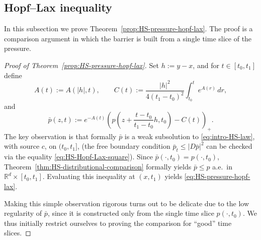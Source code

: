 \documentclass[11pt]{amsart}
\numberwithin{equation}{section}
\numberwithin{figure}{section}
\theoremstyle{plain}
\theoremstyle{definition}
\theoremstyle{remark}
\theoremstyle{plain}
\newcommand{\abs}[1]{\lvert #1 \rvert}
\def\R{\mathbb{R}}
\begin{document}
\subsection{Hopf--Lax inequality}
\label{subsec:HS-Hopf-Lax-finite-q}
In this subsection we prove Theorem~\ref{prop:HS-pressure-hopf-lax}. The proof
is a comparison argument in which the barrier is built from a single time slice of the
pressure.

\begin{proof}[Proof of Theorem~\ref{prop:HS-pressure-hopf-lax}]
Set \(h:=y-x\), and for \(t\in[t_0,t_1]\) define
\begin{equation}\label{eq:HS-Hopf-Lax-A-C}
    A(t):= A(|h|,t),
    \qquad
    C(t):=
    \frac{\abs{h}^2}{4(t_1-t_0)^2}\int_{t_0}^t e^{A(r)}\,dr,
\end{equation}
and
\begin{equation}\label{eq:HS-Hopf-Lax-subsolution}
    \bar p(z,t):=
    e^{-A(t)}
    \left(p\left(z+\frac{t-t_0}{t_1-t_0}h,t_0\right)-C(t)\right)_+ .
\end{equation}
 The key
observation is that formally \(\bar p\) is a weak subsolution
to \eqref{eq:intro-HS-law}, with source \(c\), on \((t_0,t_1]\), (the free boundary condition $\bar{p}_t \leq |D\bar{p}|^2$ can be checked via the equality \eqref{eq:HS-Hopf-Lax-square}). Since \(\bar p(\cdot,t_0)=p(\cdot,t_0)\),
Theorem~\ref{thm:HS-distributional-comparison} formally yields \(\bar p\leq p\)
a.e.\ in \(\R^d\times[t_0,t_1]\).
Evaluating this inequality at $(x,t_1)$ yields \eqref{eq:HS-pressure-hopf-lax}.


Making this simple observation rigorous turns out to be delicate due to the low regularity of \(\bar p\), since it is constructed only from
the single time slice \(p(\cdot,t_0)\).  We thus initially restrict ourselves to proving the comparison for ``good'' time slices.



\end{proof}
\end{document}
